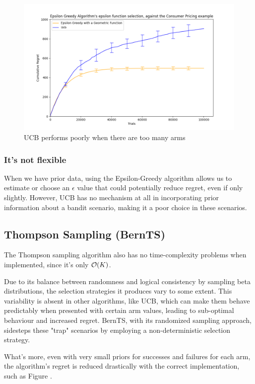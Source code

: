 \begin{figure}[h!]
    \centering
    \includegraphics[width=17cm]{report/images/UCB-worse-over-ages-cp.png}
    \caption{UCB performs poorly when there are too many arms}
    \label{fig:ucb-cp}
\end{figure}

\subsubsection{It's not flexible}

When we have prior data, using the Epsilon-Greedy algorithm allows us to estimate or choose an \(\epsilon\) value that could potentially reduce regret, even if only slightly. However, UCB has no mechanism at all in incorporating prior information about a bandit scenario, making it a poor choice in these scenarios.

\subsection{Thompson Sampling (BernTS)}

The Thompson sampling algorithm also has no time-complexity problems when implemented, since it's only $\mathcal{O}(K)$.

Due to its balance between randomness and logical consistency by sampling beta distributions, the selection strategies it produces vary to some extent. This variability is absent in other algorithms, like UCB, which can make them behave predictably when presented with certain arm values, leading to sub-optimal behaviour and increased regret. BernTS, with its randomized sampling approach, sidesteps these "trap" scenarios by employing a non-deterministic selection strategy.

What's more, even with very small priors for successes and failures for each arm, the algorithm's regret is reduced drastically with the correct implementation, such as Figure \label{fig:bernts-good-prior}.

